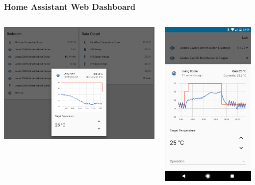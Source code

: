 \documentclass[aspectratio=169,11pt,hyperref={colorlinks=true}]{beamer}
\begin{document}
\begin{frame}
    \frametitle{Home Assistant Web Dashboard}
    \begin{columns}
        \begin{column}{.48\textwidth}
            \begin{center}
                \includegraphics[width=1.2\textwidth]{Control_panel_trimmed.png}
            \end{center}
        \end{column}
        \begin{column}{.48\textwidth}
            \begin{center}
                \includegraphics[width=.62\textwidth]{mobile_interface.png}
            \end{center}
        \end{column}
    \end{columns}
\end{frame}
\end{document}

